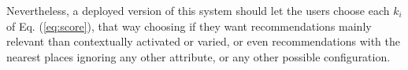 Nevertheless, a deployed version of this system should let the users choose each $k_i$ of Eq. (\ref{eq:score}), that way choosing if they want recommendations mainly relevant than contextually activated or varied, or even recommendations with the nearest places ignoring any other attribute, or any other possible configuration.